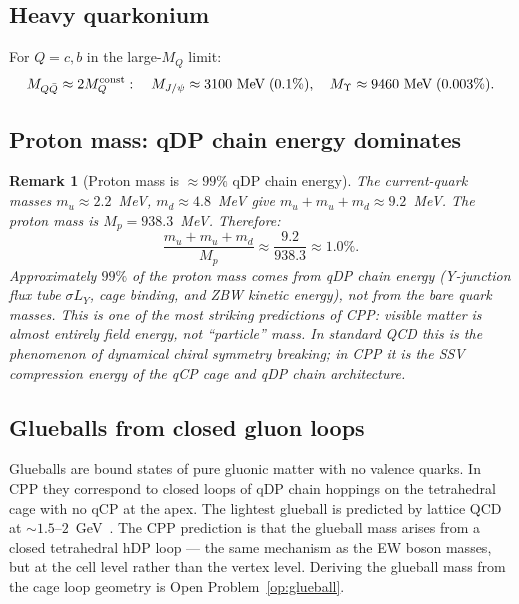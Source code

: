 \documentclass[11pt,a4paper]{article}
\newtheorem{remark}[theorem]{Remark}
\begin{document}
\subsection{Heavy quarkonium}

For $Q = c, b$ in the large-$M_Q$ limit:
\begin{equation}
M_{Q\bar{Q}} \approx 2M_Q^{\rm const}:
\quad M_{J/\psi} \approx 3100\ \text{MeV}\; (0.1\%),\quad
M_{\Upsilon} \approx 9460\ \text{MeV}\; (0.003\%).
\label{eq:quarkonium}
\end{equation}

\subsection{Proton mass: qDP chain energy dominates}

\begin{remark}[Proton mass is $\approx99\%$ qDP chain energy]
\label{rem:proton_mass}
The current-quark masses $m_u \approx 2.2$~MeV, $m_d \approx 4.8$~MeV
give $m_u + m_u + m_d \approx 9.2$~MeV.  The proton mass is
$M_p = 938.3$~MeV.  Therefore:
\begin{equation}
\frac{m_u+m_u+m_d}{M_p} \approx \frac{9.2}{938.3} \approx 1.0\%.
\label{eq:proton_chain_fraction}
\end{equation}
Approximately $99\%$ of the proton mass comes from qDP chain energy
(Y-junction flux tube $\sigma L_Y$, cage binding, and ZBW kinetic
energy), not from the bare quark masses.  This is one of the most
striking predictions of CPP: visible matter is almost entirely
field energy, not ``particle'' mass.  In standard QCD this is
the phenomenon of dynamical chiral symmetry breaking; in CPP it
is the SSV compression energy of the qCP cage and qDP chain
architecture.
\end{remark}

\subsection{Glueballs from closed gluon loops}

Glueballs are bound states of pure gluonic matter with no valence
quarks.  In CPP they correspond to closed loops of qDP chain
hoppings on the tetrahedral cage with no qCP at the apex.  The
lightest glueball is predicted by lattice QCD at
$\sim1.5$--$2$~GeV~\citep{morningstar1999}.  The CPP prediction
is that the glueball mass arises from a closed tetrahedral hDP
loop --- the same mechanism as the EW boson masses, but at the
cell level rather than the vertex level.  Deriving the glueball
mass from the cage loop geometry is Open Problem~\ref{op:glueball}.
\end{document}
